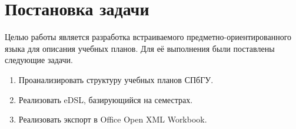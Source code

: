 
\section{Постановка задачи}
\label{sec:task}

Целью работы является разработка встраиваемого предметно-ориентированного языка для описания учебных планов.
Для её выполнения были поставлены следующие задачи.
\begin{enumerate}
    \item Проанализировать структуру учебных планов СПбГУ.
    \item Реализовать eDSL, базирующийся на семестрах.
    \item Реализовать экспорт в Office Open XML Workbook.
\end{enumerate}
